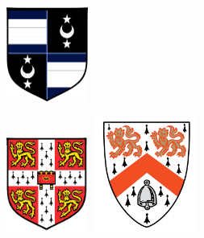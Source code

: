 \begin{crests}

\hspace{25mm}
\includegraphics[width=0.20\textwidth]{Figs/Crests/Family_Crest}
\newline

\vspace{60mm}
\includegraphics[width=0.20\textwidth]{Figs/Crests/University_Crest.pdf}
\hspace{70mm}
\includegraphics[width=36mm, height=38mm]{Figs/Crests/Wolfson_Crest.png}

\end{crests}